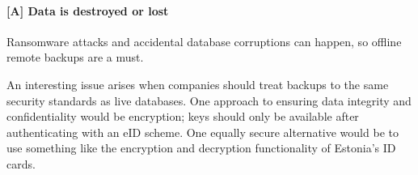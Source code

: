 \paragraph{[A] Data is destroyed or lost}

Ransomware attacks and accidental database corruptions can happen, so offline remote backups are a must.

An interesting issue arises when companies should treat backups to the same security standards as live databases. One approach to ensuring data integrity and confidentiality would be encryption; keys should only be available after authenticating with an eID scheme. One equally secure alternative would be to use something like the encryption and decryption functionality of Estonia's ID cards.